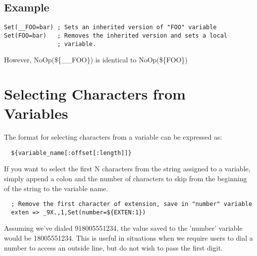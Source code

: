 \subsection{Example}
\begin{astlisting}
\begin{verbatim}
Set(__FOO=bar) ; Sets an inherited version of "FOO" variable
Set(FOO=bar)   ; Removes the inherited version and sets a local
               ; variable.
\end{verbatim}
\end{astlisting}

However, NoOp(\$\{\_\_FOO\}) is identical to NoOp(\$\{FOO\})

\section{Selecting Characters from Variables}

The format for selecting characters from a variable can be expressed as:
\begin{astlisting}
\begin{verbatim}
  ${variable_name[:offset[:length]]}
\end{verbatim}
\end{astlisting}
If you want to select the first N characters from the string assigned
to a variable, simply append a colon and the number of characters to
skip from the beginning of the string to the variable name.
\begin{astlisting}
\begin{verbatim}
  ; Remove the first character of extension, save in "number" variable
  exten => _9X.,1,Set(number=${EXTEN:1})
\end{verbatim}
\end{astlisting}
Assuming we've dialed 918005551234, the value saved to the 'number' variable
would be 18005551234. This is useful in situations when we require users to
dial a number to access an outside line, but do not wish to pass the first
digit.

